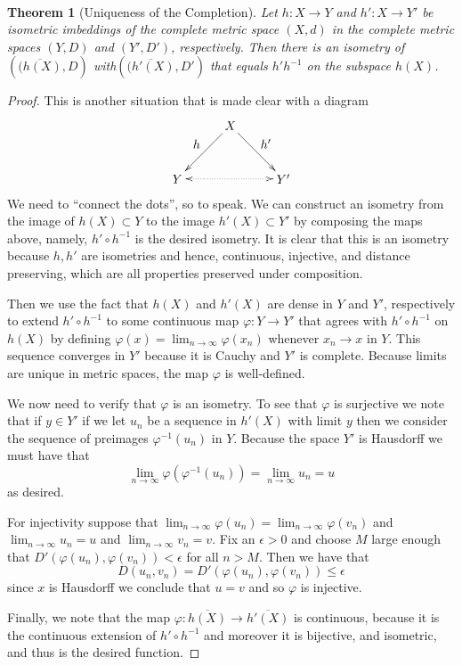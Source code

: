 \documentclass{article}
\newcommand{\exercise}[1]{\noindent{\textbf{Exercise #1:}}}
\newtheorem*{thm}{\\ Theorem}
\begin{document}
\exercise{43.10}
\begin{thm}[Uniqueness of the Completion]
  Let $h: X \to Y$ and $h':X \to Y'$ be isometric imbeddings of the
  complete metric space $(X,d)$ in the complete metric spaces $(Y,D)$
  and $(Y',D')$, respectively. Then there is an isometry of
  $(\overline{(h(X)}, D)$ with$(\overline{(h'(X)}, D')$ that equals
  $h'h^{-1}$ on the subspace $h(X)$.
\end{thm}
\begin{proof}
  This is another situation that is made clear with a diagram
  \[
  \begin{xy}
    (0,0)*+{X}="X"; (-15,-15)*+{Y}="Y";
    (15,-15)*+{Y'}="Y'";
    {\ar_{\mathlarger{h}} "X";"Y"};
    {\ar^{\mathlarger{h'}} "X";"Y'"};
    {\ar@{<.>} "Y";"Y'"};
  \end{xy}
  \]
  We need to ``connect the dots'', so to speak. We can construct an
  isometry from the image of $h(X) \subset Y$ to the image $h'(X)
  \subset Y'$ by composing the maps above, namely, $h'\circ h^{-1}$ is
  the desired isometry. It is clear that this is an isometry because
  $h,h'$ are isometries and hence, continuous, injective, and distance
  preserving, which are all properties preserved under composition.

  Then we use the fact that $h(X)$ and $h'(X)$ are dense in $Y$ and
  $Y'$, respectively to extend $h'\circ h^{-1}$ to some continuous map
  $\varphi: Y \to Y'$ that agrees with $h'\circ h^{-1}$ on $h(X)$ by
  defining $\varphi(x) = \lim_{n\to\infty} \varphi(x_n)$ whenever $x_n
  \to x$ in $Y$. This sequence converges in $Y'$ because it is Cauchy
  and $Y'$ is complete. Because limits are unique in metric spaces,
  the map $\varphi$ is well-defined.

  We now need to verify that $\varphi$ is an isometry. To see that
  $\varphi$ is surjective we note that if $y \in Y'$ if we let $u_n$
  be a sequence in $h'(X)$ with limit $y$ then we consider the
  sequence of preimages $\varphi^{-1}(u_n)$ in $Y$. Because the space
  $Y'$ is Hausdorff we must have that
  \[
  \lim_{n\to\infty}\varphi(\varphi^{-1}(u_n)) = \lim_{n\to\infty} u_n = u
  \]
  as desired.

  For injectivity suppose that $\lim_{n\to\infty} \varphi(u_n) =
  \lim_{n\to\infty} \varphi(v_n)$ and $\lim_{n\to\infty} u_n = u$ and
  $\lim_{n\to\infty} v_n = v$. Fix an $\epsilon > 0$ and choose $M$
  large enough that $D'(\varphi(u_n), \varphi(v_n)) < \epsilon$ for all
  $n > M$. Then we have that
  \[
  D(u_n, v_n) = D'(\varphi(u_n), \varphi(v_n)) \leq \epsilon
  \]
  since $x$ is Hausdorff we conclude that $u = v$ and so $\varphi$ is
  injective.

  Finally, we note that the map $\varphi: \overline{h(X)} \to
  \overline{h'(X)}$ is continuous, because it is the continuous
  extension of $h' \circ h^{-1}$ and moreover it is bijective, and
  isometric, and thus is the desired function.
\end{proof}
\end{document}
